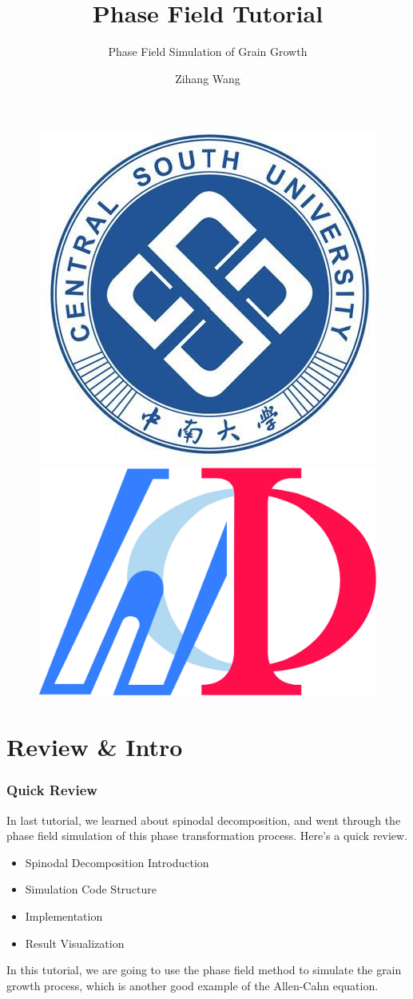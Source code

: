 \documentclass[compress,xcolor={dvipsnames}]{beamer}
\author{Zihang Wang}
\title{Phase Field Tutorial}
\subtitle{Phase Field Simulation of Grain Growth}
\institute{Central South University}
\begin{document}
\begin{frame}
    \titlepage
    \begin{figure}[!h]
        \centering
        \includegraphics[width=0.18\linewidth]{pic/csulogo.jpg}
        \includegraphics[width=0.25\linewidth]{pic/MInDes_Icon.jpg}
    \end{figure}
\end{frame}

\begin{frame}
    \tableofcontents[currentsection, hideothersubsections, sectionstyle=show/show]
\end{frame}

\section{Review \& Intro}
\begin{frame}
    \frametitle{Quick Review}
    In last tutorial, we learned about spinodal decomposition, and went through the phase field simulation of this phase transformation process. Here's a quick review.

    \begin{itemize}
        \item Spinodal Decomposition Introduction
        \item Simulation Code Structure
        \item Implementation
        \item Result Visualization
    \end{itemize}

    In this tutorial, we are going to use the phase field method to simulate the grain growth process, which is another good example of the Allen-Cahn equation.

\end{frame}
\end{document}
